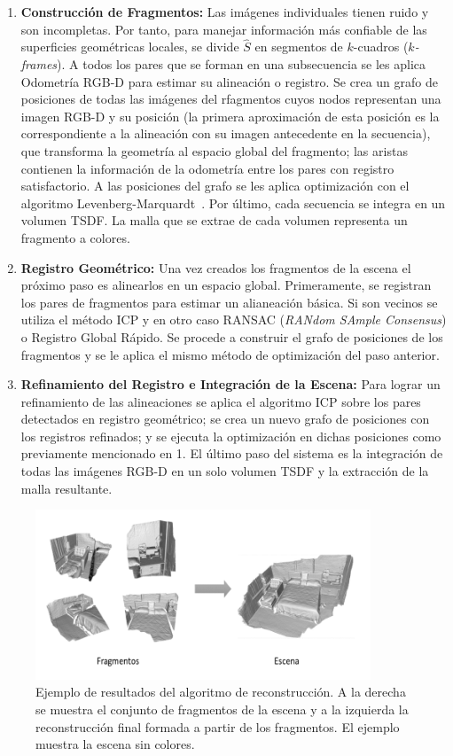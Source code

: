 \begin{enumerate}
	\item \textbf{Construcción de Fragmentos:} Las imágenes individuales tienen ruido y son incompletas. Por tanto, para manejar información más confiable de las superficies geométricas locales, se divide $\hat{S}$ en segmentos de $k$-cuadros (\textit{$k$-frames}). A todos los pares que se forman en una subsecuencia se les aplica Odometría RGB-D para estimar su alineación o registro. Se crea un grafo de posiciones de todas las imágenes del rfagmentos cuyos nodos representan una imagen RGB-D  y su posición (la primera aproximación de esta posición es la correspondiente a la alineación con su imagen antecedente en la secuencia), que transforma la geometría al espacio global del fragmento; las aristas contienen la información de la odometría entre los pares con registro satisfactorio. A las posiciones del grafo se les aplica optimización con el algoritmo Levenberg-Marquardt~\cite{more1978levenberg}. Por último, cada secuencia se integra en un volumen TSDF. La malla que se extrae de cada volumen representa un fragmento a colores.
	
	\item \textbf{Registro Geométrico:} Una vez creados los fragmentos de la escena el próximo paso es alinearlos en un espacio global. Primeramente, se registran los pares de  fragmentos para estimar un alianeación básica. Si son vecinos se utiliza el método ICP y en otro caso RANSAC (\textit{RANdom SAmple Consensus}) o Registro Global Rápido. Se procede a construir el grafo de posiciones de los fragmentos y se le aplica el mismo método de optimización del paso anterior.
	
	\item \textbf{Refinamiento del Registro e Integración de la Escena:} Para lograr un refinamiento de las alineaciones se aplica el algoritmo ICP sobre los pares detectados en registro geométrico; se crea un nuevo grafo de posiciones con los registros refinados; y se ejecuta la optimización en dichas posiciones como previamente mencionado en 1. El último paso del sistema es la integración de todas las imágenes RGB-D en un solo volumen TSDF y la extracción de la malla resultante.
\end{enumerate}

\begin{figure}[ht]
	\centering
	\includegraphics[width=10cm]{./Graphics/algo3d.png}
	\caption{Ejemplo de resultados del algoritmo de reconstrucción. A la derecha se muestra el conjunto de fragmentos de la escena y a la izquierda la reconstrucción final formada a partir de los fragmentos. El ejemplo muestra la escena sin colores.}
\end{figure}

